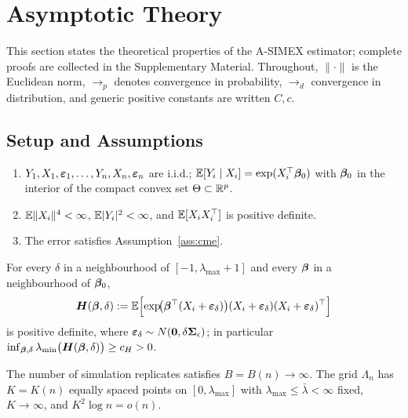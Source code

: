 \section{Asymptotic Theory}\label{sec:theory}

This section states the theoretical properties of the A-SIMEX
estimator; complete proofs are collected in the Supplementary Material.
Throughout, $\|\cdot\|$ is the Euclidean norm,
$\rightarrow_p$ denotes convergence in probability,
$\rightarrow_d$ convergence in distribution, and generic positive
constants are written $C,c$.

\subsection{Setup and Assumptions}\label{sec:assumptions}

\begin{assumption}\label{ass:model}
\leavevmode
\begin{enumerate}\itemsep2pt
\item[(a)] $Y_1,X_1,\bm{\varepsilon}_1,\dots,Y_n,X_n,\bm{\varepsilon}_n$ are i.i.d.;
      $\mathbb{E}[Y_i\mid X_i]=\exp(X_i^\top\bm{\beta}_0)$ with $\bm{\beta}_0$ in the
      interior of the compact convex set $\Theta\subset\mathbb{R}^p$.
\item[(b)] $\mathbb{E}\|X_i\|^4<\infty$, $\mathbb{E}|Y_i|^2<\infty$, and
      $\mathbb{E}[X_iX_i^\top]$ is positive definite.
\item[(c)] The error satisfies Assumption~\ref{ass:cme}.
\end{enumerate}
\end{assumption}

\begin{assumption}\label{ass:pseudo}
For every $\delta$ in a neighbourhood of $[-1,\lambda_{\max}+1]$ and
every $\bm{\beta}$ in a neighbourhood of $\bm{\beta}_0$,
\[
  \bm{H}(\bm{\beta},\delta)
  := \mathbb{E}\Bigl[\exp\!\bigl(\bm{\beta}^\top(X_i+\bm{\varepsilon}_\delta)\bigr)
      (X_i+\bm{\varepsilon}_\delta)(X_i+\bm{\varepsilon}_\delta)^\top\Bigr]
\]
is positive definite, where
$\bm{\varepsilon}_\delta\sim N(\bm 0,\delta\bm{\Sigma}_\epsilon)$; in particular
$\inf_{\bm{\beta},\delta}\lambda_{\min}\bigl(\bm{H}(\bm{\beta},\delta)\bigr)\ge c_H>0$.
\end{assumption}

\begin{assumption}\label{ass:simgrid}
The number of simulation replicates satisfies $B=B(n)\to\infty$. The
grid $\Lambda_n$ has $K=K(n)$ equally spaced points on
$[0,\lambda_{\max}]$ with $\lambda_{\max}\le\bar\lambda<\infty$ fixed,
$K\to\infty$, and $K^2\log n=o(n)$.
\end{assumption}

